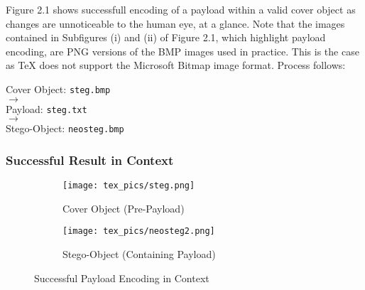 \documentclass[11pt, english]{article}
\begin{document}
	Figure 2.1 shows successfull encoding of a payload within a valid cover object as changes are unnoticeable to the human eye, at a glance. Note that the images contained in Subfigures (i) and (ii) of Figure 2.1, which highlight payload encoding, are PNG versions of the BMP images used in practice. This is the case as {\TeX} does not support the Microsoft Bitmap image format. Process follows:\\

	\begin{center}
		Cover Object: \verb|steg.bmp|\\ $\longrightarrow$\\ Payload: \verb|steg.txt|\\ $\longrightarrow$\\ Stego-Object: \verb|neosteg.bmp|
	\end{center}

		\subsubsection{Successful Result in Context}

	\begin{figure}[H]
        \begin{center}
                \begin{subfigure}[t]{6cm}
                \begin{center}
                        \texttt{[image: tex\_pics/steg.png]}
                \end{center}
                        \caption{Cover Object (Pre-Payload)}
                \end{subfigure}
                \begin{subfigure}[t]{6cm}
                \begin{center}
                        \texttt{[image: tex\_pics/neosteg2.png]}
                \end{center}
                        \caption{Stego-Object (Containing Payload)}
                \end{subfigure}
        \end{center}
                \caption{Successful Payload Encoding in Context}
        \end{figure}
\end{document}
